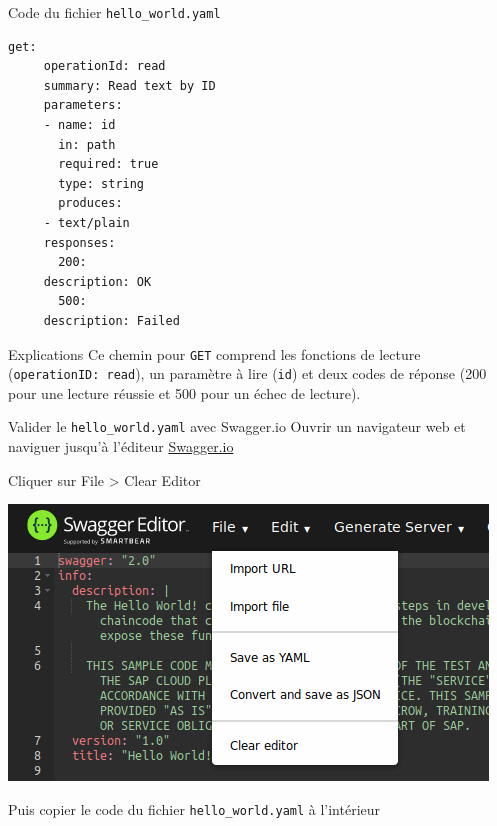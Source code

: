 \documentclass[presentation]{beamer}
\begin{document}
\begin{frame}[fragile,label={sec:orgfe421e7}]{Code du fichier \texttt{hello\_world.yaml}}
 \begin{verbatim}
get:
     operationId: read
     summary: Read text by ID
     parameters:
     - name: id
       in: path
       required: true
       type: string
       produces:
     - text/plain
     responses:
       200:
	 description: OK
       500:
	 description: Failed
\end{verbatim}
\end{frame}
\begin{frame}[fragile,label={sec:orgb1468f1}]{Explications}
 Ce chemin pour \texttt{GET} comprend les fonctions de lecture (\texttt{operationID: read}), 
un paramètre à lire (\texttt{id}) et deux codes de réponse (200 pour une lecture 
réussie et 500 pour un échec de lecture).
\end{frame}
\begin{frame}[fragile,label={sec:org28534c5}]{Valider le \texttt{hello\_world.yaml} avec Swagger.io}
 Ouvrir un navigateur web et naviguer jusqu'à l'éditeur \href{https://editor.swagger.io/}{Swagger.io}

Cliquer sur File > Clear Editor

\begin{center}
\includegraphics[width=.9\linewidth]{./swagger_file_clear.png}
\end{center}

Puis copier le code du fichier \texttt{hello\_world.yaml} à l'intérieur
\end{frame}
\end{document}
